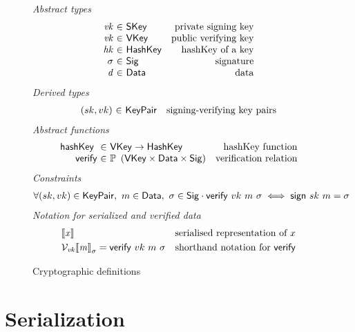 \documentclass[11pt,a4paper]{article}
\newcommand{\VKey}{\type{VKey}}
\newcommand{\SKey}{\type{SKey}}
\newcommand{\HashKey}{\type{HashKey}}
\newcommand{\KeyPair}{\type{KeyPair}}
\newcommand{\Sig}{\type{Sig}}
\newcommand{\Data}{\type{Data}}
\newcommand{\verify}[3]{\fun{verify} ~ #1 ~ #2 ~ #3}
\newcommand{\sign}[2]{\fun{sign} ~ #1 ~ #2}
\newcommand{\serialised}[1]{\llbracket \var{#1} \rrbracket}
\newcommand{\hashKey}[1]{\fun{hashKey}~ \var{#1}}
\theoremstyle{definition}
\theoremstyle{definition}
\begin{document}
\begin{figure}
  \emph{Abstract types}
  \begin{equation*}
    \begin{array}{r@{~\in~}lr}
      \var{vk} & \SKey & \text{private signing key}\\
      \var{vk} & \VKey & \text{public verifying key}\\
      \var{hk} & \HashKey & \text{hashKey of a key}\\
      \sigma & \Sig  & \text{signature}\\
      \var{d} & \Data  & \text{data}\\
    \end{array}
  \end{equation*}
  \emph{Derived types}
  \begin{equation*}
    \begin{array}{r@{~\in~}lr}
      (sk, vk) & \KeyPair & \text{signing-verifying key pairs}
    \end{array}
  \end{equation*}
  \emph{Abstract functions}
  \begin{equation*}
    \begin{array}{r@{~\in~}lr}
      \hashKey{} & \VKey \to \HashKey
      & \text{hashKey function} \\
      \fun{verify} & \powerset{\left(\VKey \times \Data \times \Sig\right)}
      & \text{verification relation}\\
    \end{array}
  \end{equation*}
  \emph{Constraints}
  \begin{align*}
    & \forall (sk, vk) \in \KeyPair,~ m \in \Data,~ \sigma \in \Sig \cdot
      \verify{vk}{m}{\sigma} \iff \sign{sk}{m} = \sigma
  \end{align*}
  \emph{Notation for serialized and verified data}
  \begin{align*}
    & \serialised{x} & \text{serialised representation of } x\\
    & \mathcal{V}_{\var{vk}}{\serialised{m}}_{\sigma} = \verify{vk}{m}{\sigma}
      & \text{shorthand notation for } \fun{verify}
  \end{align*}
  \caption{Cryptographic definitions}
  \label{fig:crypto-defs}
\end{figure}

\section{Serialization}
\label{sec:serialization}
\end{document}
